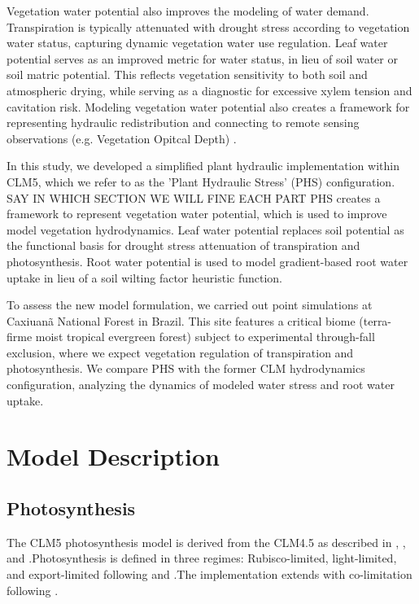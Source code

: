 \documentclass[draft,linenumbers]{agujournal}
\begin{document}
Vegetation water potential also improves the modeling of water demand.
Transpiration is typically attenuated with drought stress according to vegetation water status, capturing dynamic vegetation water use regulation.
Leaf water potential serves as an improved metric for water status, in lieu of soil water or soil matric potential.
This reflects vegetation sensitivity to both soil and atmospheric drying, while serving as a diagnostic for excessive xylem tension and cavitation risk. Modeling vegetation water potential also creates a framework for representing hydraulic redistribution \citep{lee2005} and connecting to remote sensing observations (e.g. Vegetation Opitcal Depth) \citep{konings206}.

In this study, we developed a simplified plant hydraulic implementation within CLM5, which we refer to as the 'Plant Hydraulic Stress' (PHS) configuration.
SAY IN WHICH SECTION WE WILL FINE EACH PART
PHS creates a framework to represent vegetation water potential, which is used to improve model vegetation hydrodynamics.
Leaf water potential replaces soil potential as the functional basis for drought stress attenuation of transpiration and photosynthesis.
Root water potential is used to model gradient-based root water uptake in lieu of a soil wilting factor heuristic function.

To assess the new model formulation, we carried out point simulations at Caxiuan\~a National Forest in Brazil.
This site features a critical biome (terra-firme moist tropical evergreen forest) subject to experimental through-fall exclusion, where we expect vegetation regulation of transpiration and photosynthesis.
We compare PHS with the former CLM hydrodynamics configuration, analyzing the dynamics of modeled water stress and root water uptake.

\section{Model Description}

\subsection{Photosynthesis}
\label{sect:A}
    The CLM5 photosynthesis model is derived from the CLM4.5 as described in \citet{bonan2011}, \citet{thornton2007},
    and \citet{oleson2013}.Photosynthesis is defined in three regimes: Rubisco-limited, light-limited, and export-limited 
    following \citet{farquhar1980} and \citet{harley1992}.The implementation extends \citet{sellers1996a,sellers1996b} with 
    co-limitation following \citet{collatz1991}. 
    
\end{document}
